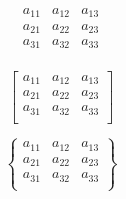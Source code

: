\documentclass{article}
\begin{document}
\begin{equation}
   \begin{matrix} 
   a_{11} & a_{12} & a_{13}  \\
   a_{21} & a_{22} & a_{23}  \\
   a_{31} & a_{32} & a_{33}  \\
   \end{matrix} 
\end{equation}

\begin{equation}
  \left[
   \begin{matrix} 
   a_{11} & a_{12} & a_{13}  \\
   a_{21} & a_{22} & a_{23}  \\
   a_{31} & a_{32} & a_{33}  \\
   \end{matrix} 
  \right]
\end{equation}

\begin{equation}
  \left\{
   \begin{matrix} 
   a_{11} & a_{12} & a_{13}  \\
   a_{21} & a_{22} & a_{23}  \\
   a_{31} & a_{32} & a_{33}  \\
   \end{matrix} 
  \right\}
\end{equation}
\end{document}
